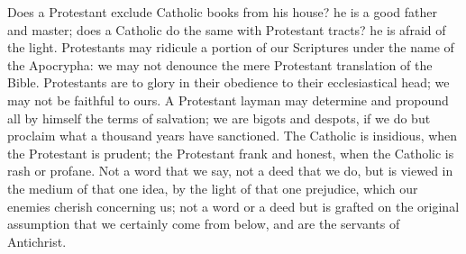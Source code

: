 Does a Protestant exclude Catholic books from his house?
he is a good father and master; does a Catholic do the
same with Protestant tracts? he is afraid of the light.
Protestants may ridicule a portion of our Scriptures
under the name of the Apocrypha: we may not denounce the
mere Protestant translation of the Bible. Protestants are
to glory in their obedience to their ecclesiastical head;
we may not be faithful to ours. A Protestant layman may
determine and propound all by himself the terms of
salvation; we are bigots and despots, if we do but
proclaim what a thousand years have sanctioned. The
Catholic is insidious, when the Protestant is prudent; the
Protestant frank and honest, when the Catholic is rash or
profane. Not a word that we say, not a deed that we do,
but is viewed in the medium of that one idea, by the
light of that one prejudice, which our enemies cherish
concerning us; not a word or a deed but is grafted on the
original assumption that we certainly come from below,
and are the servants of Antichrist.

